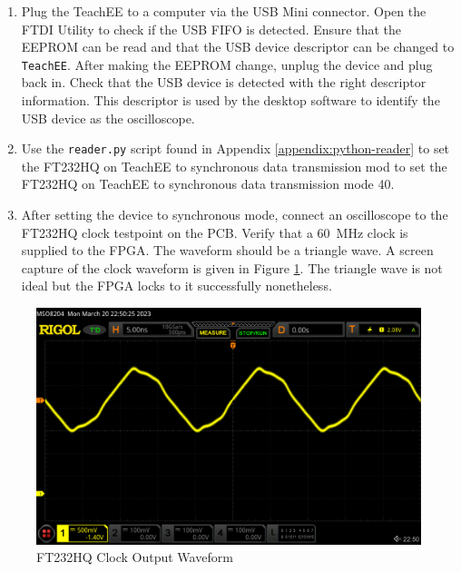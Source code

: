 \documentclass[letterpaper,11pt]{article}
\newcommand{\code}[1]{\texttt{#1}}
\begin{document}
\begin{enumerate}
  \item Plug the TeachEE to a computer via the USB Mini connector. Open the FTDI
    Utility to check if the USB FIFO is detected. Ensure that the EEPROM can be
    read and that the USB device descriptor can be changed to \code{TeachEE}.
    After making the EEPROM change, unplug the device and plug back in. Check
    that the USB device is detected with the right descriptor information. This
    descriptor is used by the desktop software to identify the USB device as the
    oscilloscope.
  \item Use the \code{reader.py} script found in Appendix
    \ref{appendix:python-reader} to set the FT232HQ on TeachEE to synchronous
    data transmission mod to set the FT232HQ on TeachEE to synchronous data
    transmission mode 40.
  \item After setting the device to synchronous mode, connect an oscilloscope to
    the FT232HQ clock testpoint on the PCB. Verify that a \SI{60}{\mega\hertz}
    clock is supplied to the FPGA. The waveform should be a triangle wave. A
    screen capture of the clock waveform is given in Figure \ref{fig:ftdi-clk}.
    The triangle wave is not ideal but the FPGA locks to it successfully
    nonetheless.

\end{enumerate}

\begin{figure}[H]
  \centering
  \includegraphics[width=12cm]{figures/ftdi-clk-cap.png}
  \caption{FT232HQ Clock Output Waveform}
  \label{fig:ftdi-clk}
\end{figure}
\end{document}
